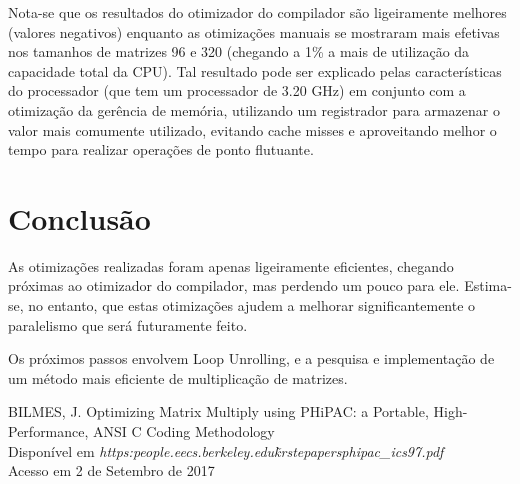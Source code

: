 \documentclass[a4paper,10pt]{article}
\begin{document}
Nota-se que os resultados do otimizador do compilador são ligeiramente melhores (valores negativos) enquanto as otimizações manuais se mostraram mais efetivas nos tamanhos de matrizes 96 e 320 (chegando a 1\% a mais de utilização da capacidade total da CPU). Tal resultado pode ser explicado pelas características do processador (que tem um processador de 3.20 GHz) em conjunto com a otimização da gerência de memória, utilizando um registrador para armazenar o valor mais comumente utilizado, evitando cache misses e aproveitando melhor o tempo para realizar operações de ponto flutuante. 

\section{Conclusão}

As otimizações realizadas foram apenas ligeiramente eficientes, chegando próximas ao otimizador do compilador, mas perdendo um pouco para ele. Estima-se, no entanto, que estas otimizações ajudem a melhorar significantemente o paralelismo que será futuramente feito.

Os próximos passos envolvem Loop Unrolling, e a pesquisa e implementação de um método mais eficiente de multiplicação de matrizes. 

\newpage
\begin{thebibliography}{9}

     BILMES, J. Optimizing Matrix Multiply using PHiPAC: a Portable, High-Performance, ANSI C Coding Methodology\\
    Disponível em \textit{https:\/\/people.eecs.berkeley.edu\/\~krste\/papers\/phipac\_ics97.pdf}\\
    Acesso em 2 de Setembro de 2017

\end{thebibliography}
\end{document}
